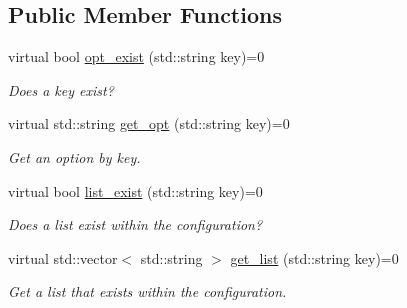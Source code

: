 \subsection*{Public Member Functions}
\begin{DoxyCompactItemize}
\item 
\hypertarget{classPropertiesReaderInterface_a092db49483a5f97b1eb6e2fdca5b97fb}{virtual bool \hyperlink{classPropertiesReaderInterface_a092db49483a5f97b1eb6e2fdca5b97fb}{opt\-\_\-exist} (std\-::string key)=0}\label{classPropertiesReaderInterface_a092db49483a5f97b1eb6e2fdca5b97fb}

\begin{DoxyCompactList}\small\item\em Does a key exist? \end{DoxyCompactList}\item 
\hypertarget{classPropertiesReaderInterface_a16db6a1917d0274811a499b2a270679b}{virtual std\-::string \hyperlink{classPropertiesReaderInterface_a16db6a1917d0274811a499b2a270679b}{get\-\_\-opt} (std\-::string key)=0}\label{classPropertiesReaderInterface_a16db6a1917d0274811a499b2a270679b}

\begin{DoxyCompactList}\small\item\em Get an option by key. \end{DoxyCompactList}\item 
\hypertarget{classPropertiesReaderInterface_ab088ce690f3f96b3f885d762289c23c2}{virtual bool \hyperlink{classPropertiesReaderInterface_ab088ce690f3f96b3f885d762289c23c2}{list\-\_\-exist} (std\-::string key)=0}\label{classPropertiesReaderInterface_ab088ce690f3f96b3f885d762289c23c2}

\begin{DoxyCompactList}\small\item\em Does a list exist within the configuration? \end{DoxyCompactList}\item 
\hypertarget{classPropertiesReaderInterface_a466f88254dc3f26691e73ba739bdabce}{virtual std\-::vector$<$ std\-::string $>$ \hyperlink{classPropertiesReaderInterface_a466f88254dc3f26691e73ba739bdabce}{get\-\_\-list} (std\-::string key)=0}\label{classPropertiesReaderInterface_a466f88254dc3f26691e73ba739bdabce}

\begin{DoxyCompactList}\small\item\em Get a list that exists within the configuration. \end{DoxyCompactList}\end{DoxyCompactItemize}


